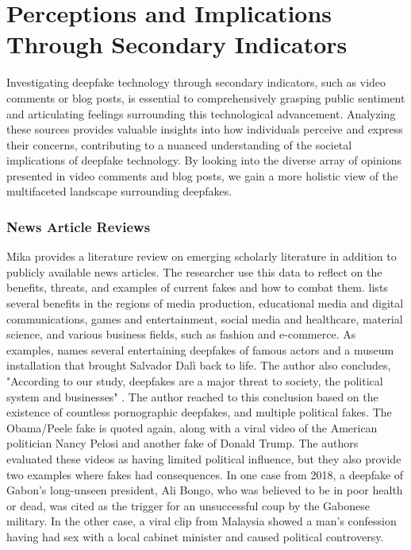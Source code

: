 \documentclass[
  a4paper,  %
  twoside,  %
  bibliography=totoc,
  headsepline,
  cleardoublepage=empty,
  parskip=half,
  draft=false
]{scrbook}
\begin{document}
\section{Perceptions and Implications Through Secondary Indicators} 
\label{sec:rel-secondary}

Investigating deepfake technology through secondary indicators, such as video comments or blog posts, is essential to comprehensively grasping public sentiment and articulating feelings surrounding this technological advancement. Analyzing these sources provides valuable insights into how individuals perceive and express their concerns, contributing to a nuanced understanding of the societal implications of deepfake technology. By looking into the diverse array of opinions presented in video comments and blog posts, we gain a more holistic view of the multifaceted landscape surrounding deepfakes.

\subsubsection*{News Article Reviews}
Mika \citeauthor{westerlundEmergenceDeepfakeTechnology2019a} provides a literature review on emerging scholarly literature in addition to publicly available news articles. The researcher use this data to reflect on the benefits, threats, and examples of current fakes and how to combat them. \citeauthor{westerlundEmergenceDeepfakeTechnology2019a} lists several benefits in the regions of media production, educational media and digital communications, games and entertainment, social media and healthcare, material science, and various business fields, such as fashion and e-commerce. As examples, \citeauthor{westerlundEmergenceDeepfakeTechnology2019a} names several entertaining deepfakes of famous actors and a museum installation that brought Salvador Dalì back to life. The author also concludes, "According to our study, deepfakes are a major threat to society, the political system and businesses" \cite{westerlundEmergenceDeepfakeTechnology2019a}. The author reached to this conclusion based on the existence of countless pornographic deepfakes, and multiple political fakes. The Obama/Peele fake is quoted again, along with a viral video of the American politician Nancy Pelosi and another fake of Donald Trump. The authors evaluated these videos as having limited political influence, but they also provide two examples where fakes had consequences. In one case from 2018, a deepfake of Gabon's long-unseen president, Ali Bongo, who was believed to be in poor health or dead, was cited as the trigger for an unsuccessful coup by the Gabonese military. In the other case, a viral clip from Malaysia showed a man's confession having had sex with a local cabinet minister and caused political controversy.
\end{document}
